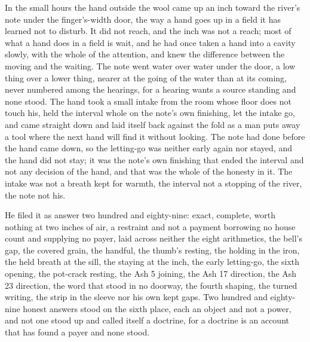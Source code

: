 \scenebreak

In the small hours the hand outside the wool came up an inch toward the river's note under the finger's-width door, the way a hand goes up in a field it has learned not to disturb. It did not reach, and the inch was not a reach; most of what a hand does in a field is wait, and he had once taken a hand into a cavity slowly, with the whole of the attention, and knew the difference between the moving and the waiting. The note went water over water under the door, a low thing over a lower thing, nearer at the going of the water than at its coming, never numbered among the hearings, for a hearing wants a source standing and none stood. The hand took a small intake from the room whose floor does not touch his, held the interval whole on the note's own finishing, let the intake go, and came straight down and laid itself back against the fold as a man puts away a tool where the next hand will find it without looking. The note had done before the hand came down, so the letting-go was neither early again nor stayed, and the hand did not stay; it was the note's own finishing that ended the interval and not any decision of the hand, and that was the whole of the honesty in it. The intake was not a breath kept for warmth, the interval not a stopping of the river, the note not his.

He filed it as answer two hundred and eighty-nine: exact, complete, worth nothing at two inches of air, a restraint and not a payment borrowing no house count and supplying no payer, laid across neither the eight arithmetics, the bell's gap, the covered grain, the handful, the thumb's resting, the holding in the iron, the held breath at the sill, the staying at the inch, the early letting-go, the sixth opening, the pot-crack resting, the Ash 5 joining, the Ash 17 direction, the Ash 23 direction, the word that stood in no doorway, the fourth shaping, the turned writing, the strip in the sleeve nor his own kept gaps. Two hundred and eighty-nine honest answers stood on the sixth place, each an object and not a power, and not one stood up and called itself a doctrine, for a doctrine is an account that has found a payer and none stood.

